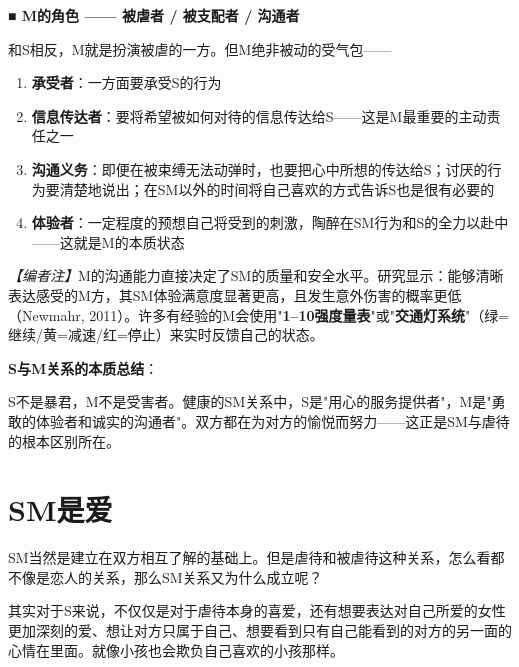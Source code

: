 \documentclass[12pt,UTF8]{ctexbook}
\begin{document}
\noindent\textbf{■ M的角色 —— 被虐者 / 被支配者 / 沟通者}

和S相反，M就是扮演被虐的一方。但M绝非被动的受气包——

\begin{enumerate}
	\item \textbf{承受者}：一方面要承受S的行为
	\item \textbf{信息传达者}：要将希望被如何对待的信息传达给S——这是M最重要的主动责任之一
	\item \textbf{沟通义务}：即便在被束缚无法动弹时，也要把心中所想的传达给S；讨厌的行为要清楚地说出；在SM以外的时间将自己喜欢的方式告诉S也是很有必要的
	\item \textbf{体验者}：一定程度的预想自己将受到的刺激，陶醉在SM行为和S的全力以赴中——这就是M的本质状态
\end{enumerate}

\textit{【编者注】}M的沟通能力直接决定了SM的质量和安全水平。研究显示：能够清晰表达感受的M方，其SM体验满意度显著更高，且发生意外伤害的概率更低（Newmahr, 2011）。许多有经验的M会使用"\textbf{1--10强度量表}"或"\textbf{交通灯系统}"（绿=继续/黄=减速/红=停止）来实时反馈自己的状态。

\noindent\textbf{S与M关系的本质总结}：

\begin{center}
\end{center}

\begin{tcolorbox}[colback=pink!5!white,colframe=red!50!black,title=贴心小叮咛]
S不是暴君，M不是受害者。健康的SM关系中，S是"用心的服务提供者"，M是"勇敢的体验者和诚实的沟通者"。双方都在为对方的愉悦而努力——这正是SM与虐待的根本区别所在。
\end{tcolorbox}

\section{SM是爱}

SM当然是建立在双方相互了解的基础上。但是虐待和被虐待这种关系，怎么看都不像是恋人的关系，那么SM关系又为什么成立呢？

其实对于S来说，不仅仅是对于虐待本身的喜爱，还有想要表达对自己所爱的女性更加深刻的爱、想让对方只属于自己、想要看到只有自己能看到的对方的另一面的心情在里面。就像小孩也会欺负自己喜欢的小孩那样。
\end{document}
